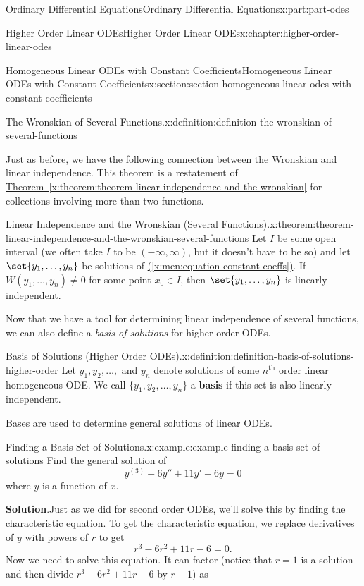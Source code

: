 \documentclass[twoside,10pt,]{book}
\newcommand{\blocktitlefont}{\relax}
\newcommand{\xreffont}{\relax}
\newcommand{\terminology}[1]{\textbf{#1}}
\numberwithin{equation}{part}
\begin{document}
\begin{partptx}{Ordinary Differential Equations}{}{Ordinary Differential Equations}{}{}{x:part:part-odes}
\begin{chapterptx}{Higher Order Linear ODEs}{}{Higher Order Linear ODEs}{}{}{x:chapter:higher-order-linear-odes}
\begin{sectionptx}{Homogeneous Linear ODEs with Constant Coefficients}{}{Homogeneous Linear ODEs with Constant Coefficients}{}{}{x:section:section-homogeneous-linear-odes-with-constant-coefficients}
\begin{definition}{The Wronskian of Several Functions.}{x:definition:definition-the-wronskian-of-several-functions}
\end{definition}
Just as before, we have the following connection between the Wronskian and linear independence. This theorem is a restatement of \hyperref[x:theorem:theorem-linear-independence-and-the-wronskian]{Theorem~{\xreffont\ref{x:theorem:theorem-linear-independence-and-the-wronskian}}} for collections involving more than two functions.%
\begin{theorem}{Linear Independence and the Wronskian (Several Functions).}{}{x:theorem:theorem-linear-independence-and-the-wronskian-several-functions}%
Let \(I\) be some open interval (we often take \(I\) to be \((-\infty,\infty)\), but it doesn't have to be so) and let \(\set{y_{1},\dots,y_{n}}\) be solutions of \hyperref[x:men:equation-constant-coeffs]{({\xreffont\ref{x:men:equation-constant-coeffs}})}. If \(W(y_{1},\dots,y_{n})\neq0\) for some point \(x_{0}\in I\), then \(\set{y_{1},\dots,y_{n}}\) is linearly independent.%
\end{theorem}
Now that we have a tool for determining linear independence of several functions, we can also define a \emph{basis of solutions} for higher order ODEs.%
\begin{definition}{Basis of Solutions (Higher Order ODEs).}{x:definition:definition-basis-of-solutions-higher-order}%
%
Let \(y_{1}, y_{2},\ldots,\) and \(y_{n}\) denote solutions of some \(n^{\text{th}}\) order linear homogeneous ODE. We call \(\{y_{1},y_{2},\ldots,y_{n}\}\) a \terminology{basis} if this set is also linearly independent.%
\end{definition}
Bases are used to determine general solutions of linear ODEs.%
\begin{example}{Finding a Basis Set of Solutions.}{x:example:example-finding-a-basis-set-of-solutions}%
Find the general solution of%
\begin{equation*}
y^{(3)}-6y''+11y'-6y=0
\end{equation*}
where \(y\) is a function of \(x\).%
\par\smallskip%
\noindent\textbf{\blocktitlefont Solution}.\hypertarget{g:solution:idp105548815746848}{}\quad{}Just as we did for second order ODEs, we'll solve this by finding the characteristic equation. To get the characteristic equation, we replace derivatives of \(y\) with powers of \(r\) to get%
\begin{equation*}
r^{3}-6r^{2}+11r-6=0.
\end{equation*}
Now we need to solve this equation. It can factor (notice that \(r=1\) is a solution and then divide \(r^{3}-6r^{2}+11r-6\) by \(r-1\)) as%

\end{example}
\end{sectionptx}
\end{chapterptx}
\end{partptx}
\end{document}
